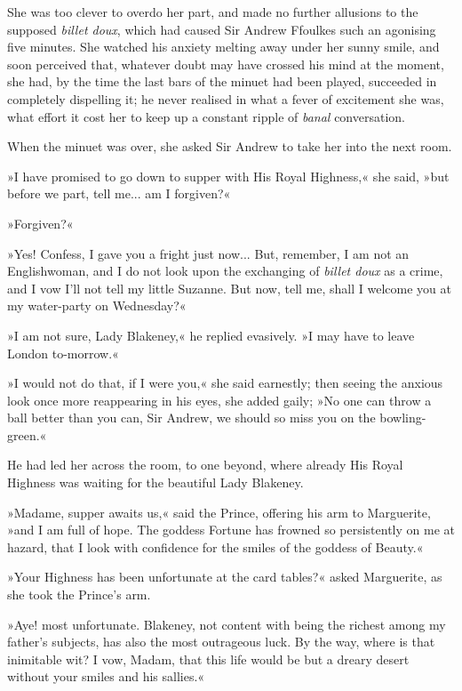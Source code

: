 She was too clever to overdo her part, and made no further allusions to the supposed \textit{billet doux}, which had caused Sir Andrew Ffoulkes such an agonising five minutes. She watched his anxiety melting away under her sunny smile, and soon perceived that, whatever doubt may have crossed his mind at the moment, she had, by the time the last bars of the minuet had been played, succeeded in completely dispelling it; he never realised in what a fever of excitement she was, what effort it cost her to keep up a constant ripple of \textit{banal} conversation.

When the minuet was over, she asked Sir Andrew to take her into the next room.

»I have promised to go down to supper with His Royal Highness,« she said, »but before we part, tell me... am I forgiven?«

»Forgiven?«

»Yes! Confess, I gave you a fright just now... But, remember, I am not an Englishwoman, and I do not look upon the exchanging of \textit{billet doux} as a crime, and I vow I'll not tell my little Suzanne. But now, tell me, shall I welcome you at my water-party on Wednesday?«

»I am not sure, Lady Blakeney,« he replied evasively. »I may have to leave London to-morrow.«

»I would not do that, if I were you,« she said earnestly; then seeing the anxious look once more reappearing in his eyes, she added gaily; »No one can throw a ball better than you can, Sir Andrew, we should so miss you on the bowling-green.«

He had led her across the room, to one beyond, where already His Royal Highness was waiting for the beautiful Lady Blakeney.

»Madame, supper awaits us,« said the Prince, offering his arm to Marguerite, »and I am full of hope. The goddess Fortune has frowned so persistently on me at hazard, that I look with confidence for the smiles of the goddess of Beauty.«

»Your Highness has been unfortunate at the card tables?« asked Marguerite, as she took the Prince's arm.

»Aye! most unfortunate. Blakeney, not content with being the richest among my father's subjects, has also the most outrageous luck. By the way, where is that inimitable wit? I vow, Madam, that this life would be but a dreary desert without your smiles and his sallies.«

